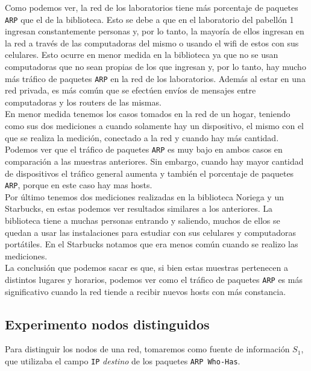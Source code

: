Como podemos ver, la red de los laboratorios tiene más porcentaje de paquetes \texttt{ARP} que el de la biblioteca. Esto se debe a que en el laboratorio del pabellón 1 ingresan
constantemente personas y, por lo tanto, la mayoría de ellos ingresan en la red a través de las computadoras del mismo o usando el wifi de estos con sus celulares. Esto
ocurre en menor medida en la biblioteca ya que no se usan computadoras que no sean propias de los que ingresan y, por lo tanto, hay mucho más tráfico de paquetes \texttt{ARP} en la red
de los laboratorios. Además al estar en una red privada, es más común que se efectúen envíos de mensajes entre computadoras y los routers de las mismas.\\

En menor medida tenemos los casos tomados en la red de un hogar, teniendo como sus dos mediciones a cuando solamente hay un dispositivo, el mismo con el que se realiza la medición,
conectado a la red y cuando hay más cantidad. Podemos ver que el tráfico de paquetes \texttt{ARP} es muy bajo en ambos casos en comparación a las muestras anteriores. Sin embargo,
cuando hay mayor cantidad de dispositivos el tráfico general aumenta y también el porcentaje de paquetes \texttt{ARP}, porque en este caso hay mas hosts.\\

Por último tenemos dos mediciones realizadas en la biblioteca Noriega y un Starbucks, en estas podemos ver resultados similares a los anteriores. La biblioteca tiene a muchas
personas entrando y saliendo, muchos de ellos se quedan a usar las instalaciones para estudiar con sus celulares y computadoras portátiles. En el Starbucks notamos que era menos
común cuando se realizo las mediciones.\\

La conclusión que podemos sacar es que, si bien estas muestras pertenecen a distintos lugares y horarios, podemos ver como el tráfico de paquetes \texttt{ARP} es más significativo cuando
la red tiende a recibir nuevos hosts con más constancia.



\subsection{Experimento nodos distinguidos}

Para distinguir los nodos de una red, tomaremos como fuente de información $S_1$, que utilizaba el campo
\texttt{IP} \textit{destino} de los paquetes \texttt{ARP Who-Has}.

